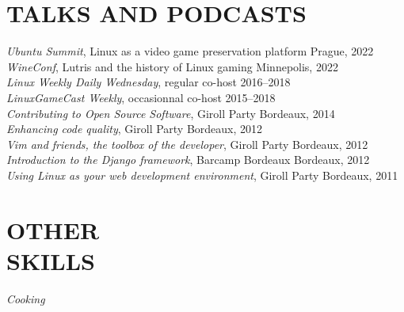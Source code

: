 \documentclass[line,resmargin]{res}
\begin{document}
\begin{resume}
\section{TALKS AND PODCASTS}
    {\sl Ubuntu Summit}, Linux as a video game preservation platform \hfill Prague, 2022 \\
    {\sl WineConf}, Lutris and the history of Linux gaming \hfill Minnepolis, 2022  \\
    {\sl Linux Weekly Daily Wednesday}, regular co-host \hfill 2016--2018 \\
    {\sl LinuxGameCast Weekly}, occasionnal co-host \hfill 2015--2018 \\
    {\sl Contributing to Open Source Software},  Giroll Party \hfill Bordeaux, 2014 \\
    {\sl Enhancing code quality}, Giroll Party \hfill Bordeaux, 2012 \\
    {\sl Vim and friends, the toolbox of the developer}, Giroll Party \hfill Bordeaux, 2012 \\
    {\sl Introduction to the Django framework}, Barcamp Bordeaux \hfill Bordeaux, 2012 \\
    {\sl Using Linux as your web development environment}, Giroll Party \hfill Bordeaux, 2011

\section{OTHER \\ SKILLS}
    {\sl Cooking} \\

\end{resume}
\end{document}
